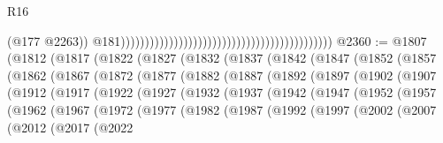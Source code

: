 \begin{lexlean}{R16}
\begin{coremodule}
                                                                                              (@177
                                                                                                @2263))
                                                                                            @181))))))))))))))))))))))))))))))))))))))))))))
@2360 := @1807
    (@1812
      (@1817
        (@1822
          (@1827
            (@1832
              (@1837
                (@1842
                  (@1847
                    (@1852
                      (@1857
                        (@1862
                          (@1867
                            (@1872
                              (@1877
                                (@1882
                                  (@1887
                                    (@1892
                                      (@1897
                                        (@1902
                                          (@1907
                                            (@1912
                                              (@1917
                                                (@1922
                                                  (@1927
                                                    (@1932
                                                      (@1937
                                                        (@1942
                                                          (@1947
                                                            (@1952
                                                              (@1957
                                                                (@1962
                                                                  (@1967
                                                                    (@1972
                                                                      (@1977
                                                                        (@1982
                                                                          (@1987
                                                                            (@1992
                                                                              (@1997
                                                                                (@2002
                                                                                  (@2007
                                                                                    (@2012
                                                                                      (@2017
                                                                                        (@2022

\end{coremodule}
\end{lexlean}
